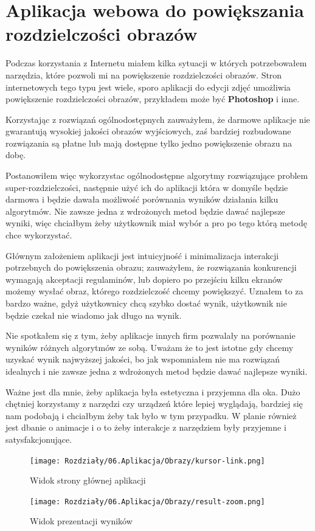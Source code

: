\chapter{Aplikacja webowa do powiększania rozdzielczości obrazów}

Podczas korzystania z Internetu miałem kilka sytuacji w których potrzebowałem narzędzia, które pozwoli mi na powiększenie rozdzielczości obrazów. Stron internetowych tego typu jest wiele, sporo aplikacji do edycji zdjęć umożliwia powiększenie rozdzielczości obrazów, przykładem może być \textbf{Photoshop} i inne.

Korzystając z rozwiązań ogólnodostępnych zauważyłem, że darmowe aplikacje nie gwarantują wysokiej jakości obrazów wyjściowych, zaś bardziej rozbudowane rozwiązania są płatne lub mają dostępne tylko jedno powiększenie obrazu na dobę. 

Postanowiłem więc wykorzystac ogólnodostępne algorytmy rozwiązujące problem super-rozdzielczości, następnie użyć ich do aplikacji która w domyśle będzie darmowa i będzie dawała możliwość porównania wyników działania kilku algorytmów. Nie zawsze jedna z wdrożonych metod będzie dawać najlepsze wyniki, więc chciałbym żeby użytkownik miał wybór a pro po tego którą metodę chce wykorzystać.

Głównym założeniem aplikacji jest intuicyjność i minimalizacja interakcji potrzebnych do powiększenia obrazu; zauważyłem, że rozwiązania konkurencji wymagają akceptacji regulaminów, lub dopiero po przejściu kilku ekranów możemy wysłać obraz, którego rozdzielczość chcemy powiększyć. Uznałem to za bardzo ważne, gdyż użytkownicy chcą szybko dostać wynik, użytkownik nie będzie czekał nie wiadomo jak długo na wynik.

Nie spotkałem się z tym, żeby aplikacje innych firm pozwalały na porównanie wyników różnych algorytmów ze sobą. Uważam że to jest istotne gdy chcemy uzyskać wynik najwyższej jakości, bo jak wspomniałem nie ma rozwiązań idealnych i nie zawsze jedna z wdrożonych metod będzie dawać najlepsze wyniki.

Ważne jest dla mnie, żeby aplikacja była estetyczna i przyjemna dla oka. Dużo chętniej korzystamy z narzędzi czy urządzeń które lepiej wyglądają, bardziej się nam podobają i chciałbym żeby tak było w tym przypadku. W planie również jest dbanie o animacje i o to żeby interakcje z narzędziem były przyjemne i satysfakcjonujące.

\newpage
\begin{figure}[H]
    \begin{minipage}{\linewidth}
        \centering
        \texttt{[image: Rozdziały/06.Aplikacja/Obrazy/kursor-link.png]}  
        \caption{Widok strony głównej aplikacji}
        \label{fig:image80}
        \texttt{[image: Rozdziały/06.Aplikacja/Obrazy/result-zoom.png]}  
        \caption{Widok prezentacji wyników}
        \label{fig:image81}
    \end{minipage}
\end{figure}
\newpage

